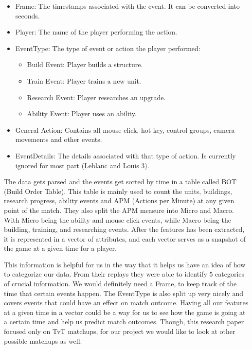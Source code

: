\documentclass[a4paper,12pt]{report}
\begin{document}
\begin{itemize}[,]
    \setlength\itemsep{-.1cm}
    \item Frame: The timestamps associated with the event. It can be converted into seconds.
    \item Player: The name of the player performing the action.
    \item EventType: The type of event or action the player performed:
    \vspace*{-2mm}
    \begin{itemize}[,]
        \setlength\itemsep{0cm}
        \item Build Event: Player builds a structure.
        \item Train Event: Player trains a new unit.
        \item Research Event: Player researches an upgrade.
        \item Ability Event: Player uses an ability.
    \end{itemize}
    \item General Action: Contains all mouse-click, hot-key, control groups, camera movements and other events.
    \item EventDetails: The details associated with that type of action. Is currently ignored for most part (Leblanc and Louis 3).
\end{itemize}

The data gets parsed and the events get sorted by time in a table called BOT (Build Order Table). This table is mainly used to count the units, buildings, research progress, ability events and APM (Actions per Minute) at any given point of the match. They also split the APM measure into Micro and Macro. With Micro being the ability and mouse click events, while Macro being the building, training, and researching events. After the features has been extracted, it is represented in a vector of attributes, and each vector serves as a snapshot of the game at a given time for a player.

This information is helpful for us in the way that it helps us have an idea of how to categorize our data. From their replays they were able to identify 5 categories of crucial information. We would definitely need a Frame, to keep track of the time that certain events happen. The EventType is also split up very nicely and covers events that could have an effect on match outcome. Having all our features at a given time in a vector could be a way for us to see how the game is going at a certain time and help us predict match outcomes. Though, this research paper focused only on TvT matchups, for our project we would like to look at other possible matchups as well.
\end{document}

